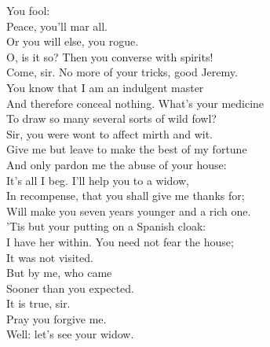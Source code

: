 \documentclass[a4paper,oneside,12pt]{memoir}
\begin{document}
\begin{drama*}
\subtlespeaks {} You fool:\\
Peace, you'll mar all.\\
\facespeaks {}
 Or you will else, you rogue.\\
\lovewitspeaks O, is it so? Then you converse with spirits!\\
Come, sir. No more of your tricks, good Jeremy.\\
You know that I am an indulgent master\\
And therefore conceal nothing. What's your medicine\\
To draw so many several sorts of wild fowl?\\
\facespeaks Sir, you were wont to affect mirth and wit.\\
Give me but leave to make the best of my fortune\\
And only pardon me the abuse of your house:\\
It's all I beg. I'll help you to a widow,\\
In recompense, that you shall give me thanks for;\\
Will make you seven years younger and a rich one.\\
'Tis but your putting on a Spanish cloak:\\
I have her within. You need not fear the house;\\
It was not visited.\\
\lovewitspeaks {} But by me, who came\\
Sooner than you expected.\\
\facespeaks {} It is true, sir.\\
Pray you forgive me.\\
\lovewitspeaks {} Well: let's see your widow.\\

\scene


\end{drama*}
\end{document}
